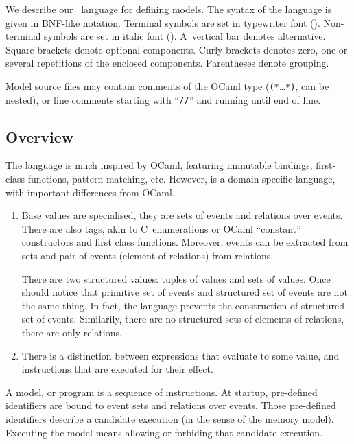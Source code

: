 We describe our \cat{}~language for defining models.
The syntax of the language is given in BNF-like notation. Terminal
symbols are set in typewriter font ().
Non-terminal symbols are set in italic font ().
A~vertical bar \synt{\ldots\orelse\ldots}
denotes alternative.
Square brackets \synt{\boption{}\ldots\eoption{}} denote optional components. Curly brackets
\synt{\brepet{}\ldots\erepet{}} denotes zero,
one or several repetitions of the enclosed
components.
Parentheses \synt{\bparen{}\ldots\eparen{}} denote grouping.


Model source files may contain comments of the OCaml type
(\verb+(*+\ldots \verb+*)+, can be nested), or line comments starting with
``\verb+//+'' and running until end of line.

\subsection{\label{overview}Overview}
The \cat{} language is much inspired by OCaml, featuring immutable bindings,
first-class functions, pattern matching, etc.
However, \cat{} is a domain specific language, with important differences
from OCaml.
\begin{enumerate}
\item
Base values are specialised, they are sets of events and relations
over events. There are also tags, akin to C~enumerations or OCaml
``constant'' constructors and first class functions. Moreover, events
can be extracted from sets and pair of events (element of relations)
from relations.

There are two structured values: tuples of values and sets of values.
Once should notice that primitive set of events and structured set of events are not the same
thing. In fact, the language prevents the construction of structured set of events.
Similarily, there are no structured sets of elements of relations, there are only relations.

\item There is a distinction between expressions that evaluate
to some value, and instructions that are executed for their effect.
\end{enumerate}
A model, or \cat{} program is a sequence of instructions.
At startup, pre-defined identifiers are bound to event sets and relations
over events.
Those pre-defined identifiers describe a candidate execution
(in the sense of the memory model).
Executing the model means allowing or forbiding that candidate
execution.


